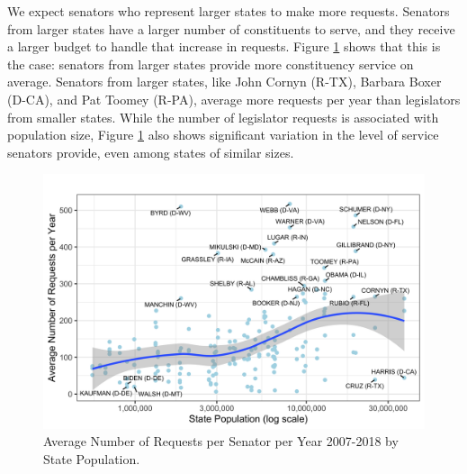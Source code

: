 \documentclass[12pt]{article}
\begin{document}
We expect senators who represent larger states to make more requests. Senators from larger states have a larger number of constituents to serve, and they receive a larger budget to handle that increase in requests.
Figure \ref{f:stateSize} shows that this is the case: senators from larger states provide more constituency service on average. Senators from larger states, like John Cornyn (R-TX), Barbara Boxer (D-CA), and Pat Toomey (R-PA), average more requests per year than legislators from smaller states. While the number of legislator requests is associated with population size, Figure \ref{f:stateSize} also shows significant variation in the level of service senators provide, even among states of similar sizes.  

\begin{figure}
\centering
\caption{Average Number of Requests per Senator per Year 2007-2018 by State Population.} \label{f:stateSize}
\includegraphics[width = \textwidth]{figs/pop-1}
\end{figure}


\end{document}
